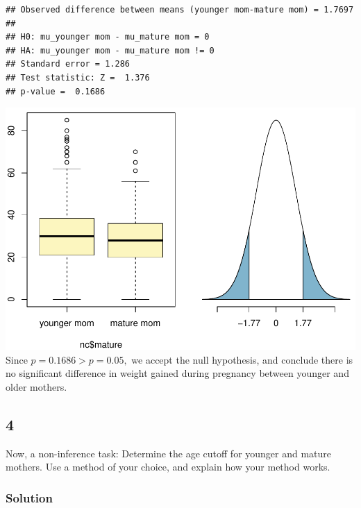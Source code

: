 \documentclass[]{article}
\newenvironment{Shaded}{\begin{snugshade}}{\end{snugshade}}
\newcommand{\KeywordTok}[1]{\textcolor[rgb]{0.13,0.29,0.53}{\textbf{#1}}}
\newcommand{\OperatorTok}[1]{\textcolor[rgb]{0.81,0.36,0.00}{\textbf{#1}}}
\newcommand{\NormalTok}[1]{#1}
\begin{document}
\begin{verbatim}
## Observed difference between means (younger mom-mature mom) = 1.7697
## 
## H0: mu_younger mom - mu_mature mom = 0 
## HA: mu_younger mom - mu_mature mom != 0 
## Standard error = 1.286 
## Test statistic: Z =  1.376 
## p-value =  0.1686
\end{verbatim}

\includegraphics{DATA_606_Lab_5_files/figure-latex/unnamed-chunk-8-1.pdf}
Since \(p = 0.1686 > p = 0.05,\) we accept the null hypothesis, and
conclude there is no significant difference in weight gained during
pregnancy between younger and older mothers.

\subsection{4}\label{section-3}

Now, a non-inference task: Determine the age cutoff for younger and
mature mothers. Use a method of your choice, and explain how your method
works.

\subsubsection{Solution}\label{solution-8}

\begin{Shaded}
\end{Shaded}
\end{document}
